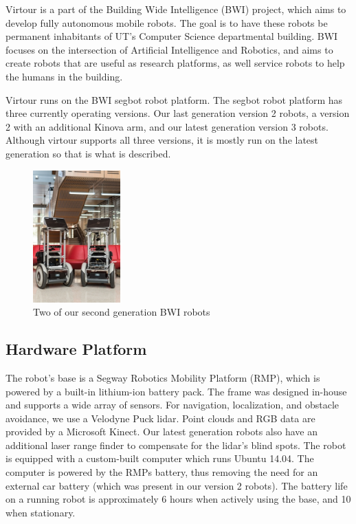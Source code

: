 \documentclass[
  oneside,
  11pt, a4paper,
  footinclude=true,
  headinclude=true,
  cleardoublepage=empty
]{article}
\begin{document}
Virtour is a part of the Building Wide Intelligence (BWI) project,
which aims to develop fully autonomous mobile robots. The goal is to have these
robots be permanent inhabitants of UT's Computer Science departmental
building. BWI focuses on the intersection of Artificial Intelligence and
Robotics, and aims to create robots that are useful as research platforms, as
well service robots to help the humans in the building.

Virtour runs on the BWI segbot robot platform. The segbot robot platform
has three currently operating versions. Our last generation version 2 robots, a
version 2 with an additional Kinova arm, and our latest generation version 3
robots. Although virtour supports all three versions, it is mostly run on the
latest generation so that is what is described.

\begin{figure}
\centering
\includegraphics[height=2in]{bwi}
\caption{Two of our second generation BWI robots}
\end{figure}

\subsection{Hardware Platform}

The robot's base is a Segway Robotics Mobility Platform (RMP), which is powered
by a built-in lithium-ion battery pack. The frame was designed in-house and
supports a wide array of sensors. For navigation, localization, and obstacle
avoidance, we use a Velodyne Puck lidar. Point clouds and RGB data are provided
by a Microsoft Kinect. Our latest generation robots also have an additional
laser range finder to compensate for the lidar's blind spots. The robot is
equipped with a custom-built computer which runs Ubuntu 14.04. The computer is
powered by the RMPs battery, thus removing the need for an external car battery
(which was present in our version 2 robots).  The battery life on a running
robot is approximately 6 hours when actively using the base, and 10 when
stationary.
\end{document}
